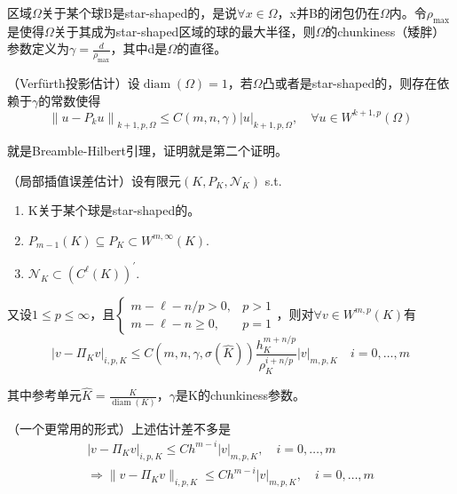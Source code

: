 区域$\Omega$关于某个球B是star-shaped的，是说$\forall x \in \Omega$，x并B的闭包仍在$\Omega$内。令$\rho_{\max}$是使得$\Omega$关于其成为star-shaped区域的球的最大半径，则$\Omega$的chunkiness（矮胖）参数定义为$\gamma = \frac{d}{\rho_{\max}}$，其中d是$\Omega$的直径。

\begin{lem}
  （Verfürth投影估计）设$\operatorname{diam}(\Omega)=1$，若$\Omega$凸或者是star-shaped的，则存在依赖于$\gamma$的常数使得
  \[
    \left\|u-P_{k} u\right\|_{k+1, p, \Omega} \le C(m, n, \gamma)|u|_{k+1, p, \Omega}, \quad \forall u \in W^{k+1, p}(\Omega)
  \]
\end{lem}

就是Breamble-Hilbert引理，证明就是第二个证明。

\begin{thm}
  （局部插值误差估计）设有限元$\left(K, P_{K}, \mathcal{N}_{K}\right)$ s.t.
  \begin{enumerate}
    \item K关于某个球是star-shaped的。
    \item $P_{m-1}(K) \subseteq P_{K} \subset W^{m, \infty}(K)$.
    \item $\mathcal{N}_{K} \subset\left(C^{\ell}(K)\right)^{\prime}$.
  \end{enumerate}
  
  又设$1 \le p \le \infty$，且$\left\{\begin{array}{ll}
    m-\ell-n / p>0, & p>1 \\
    m-\ell-n \geq 0, & p=1
  \end{array}\right.$，则对$\forall v \in W^{m, p}(K)$有
  \[
    \left|v-\Pi_{K} v\right|_{i, p, K} \le C(m, n, \gamma, \sigma(\widehat{K})) \frac{h_{K}^{m+n / p}}{\rho_{K}^{i+n / p}}|v|_{m, p, K} \quad i = 0, \dots, m
  \]

  其中参考单元$\widehat{K}=\frac{K}{\operatorname{diam}(K)}$，$\gamma$是K的chunkiness参数。

  （一个更常用的形式）上述估计差不多是
  \[
    \begin{aligned}
      |v - \Pi_K v|_{i, p, K} \le C h^{m - i} |v|_{m, p, K}, \quad i = 0, \dots, m\\
      \Rightarrow \|v - \Pi_K v\|_{i, p, K} \le C h^{m - i} |v|_{m, p, K}, \quad i = 0, \dots, m
    \end{aligned}
  \]
\end{thm}

